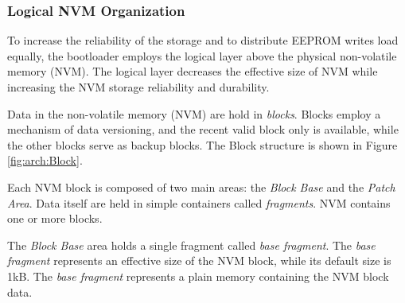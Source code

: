 \subsubsection{Logical NVM Organization}\label{sec:arch:EEPROMMap:logical}

To increase the reliability of the storage and to distribute EEPROM writes load equally, the bootloader employs the logical layer above the physical non-volatile memory (NVM). 
The logical layer decreases the effective size of NVM while increasing the NVM storage reliability and durability. 

Data in the non-volatile memory (NVM) are hold in \textit{blocks}. Blocks employ a mechanism of data versioning, 
and the recent valid block only is available, while the other blocks serve as backup blocks. The Block structure is shown in Figure \ref{fig:arch:Block}. 


Each NVM block is composed of two main areas: the \textit{Block Base} and the \textit{Patch Area}. 
Data itself are held in simple containers called \textit{fragments}. NVM contains one or more blocks.

The \textit{Block Base} area holds a single fragment called \textit{base fragment}. 
The \textit{base fragment} represents an effective size of the NVM block, while its default size is 1kB.
The \textit{base fragment} represents a plain memory containing the NVM block data.


